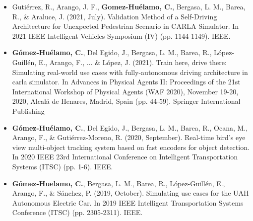 \begin{refsection}
\begin{itemize}
\item Gutiérrez, R., Arango, J. F., \textbf{Gomez-Huélamo, C.}, Bergasa, L. M., Barea, R., \& Araluce, J. (2021, July). Validation Method of a Self-Driving Architecture for Unexpected Pedestrian Scenario in CARLA Simulator. In 2021 IEEE Intelligent Vehicles Symposium (IV) (pp. 1144-1149). IEEE.

\item \textbf{Gómez-Huélamo, C.}, Del Egido, J., Bergasa, L. M., Barea, R., López-Guillén, E., Arango, F., ... \& López, J. (2021). Train here, drive there: Simulating real-world use cases with fully-autonomous driving architecture in carla simulator. In Advances in Physical Agents II: Proceedings of the 21st International Workshop of Physical Agents (WAF 2020), November 19-20, 2020, Alcalá de Henares, Madrid, Spain (pp. 44-59). Springer International Publishing

\item \textbf{Gómez-Huélamo, C.}, Del Egido, J., Bergasa, L. M., Barea, R., Ocana, M., Arango, F., \& Gutiérrez-Moreno, R. (2020, September). Real-time bird’s eye view multi-object tracking system based on fast encoders for object detection. In 2020 IEEE 23rd International Conference on Intelligent Transportation Systems (ITSC) (pp. 1-6). IEEE.

\item \textbf{Gómez-Huelamo, C.}, Bergasa, L. M., Barea, R., López-Guillén, E., Arango, F., \& Sánchez, P. (2019, October). Simulating use cases for the UAH Autonomous Electric Car. In 2019 IEEE Intelligent Transportation Systems Conference (ITSC) (pp. 2305-2311). IEEE.

\end{itemize}

\end{refsection}

